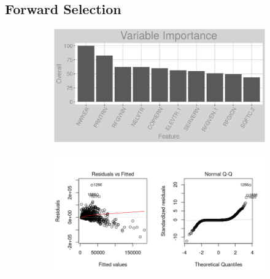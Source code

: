 \subsection{Forward Selection}
\label{appendix:electricity:lp}
\begin{figure}[h]
\centering
\begin{subfigure}{1\textwidth}
\centering
\includegraphics[width=.99\textwidth, height=0.3\textheight]{Images/electricity_lp_vars.png}
\end{subfigure}
\begin{subfigure}{1\textwidth}
\centering
\includegraphics[width=.99\textwidth, height=0.475\textheight]{Images/electricity_lp_res_1.png}
\end{subfigure}
\end{figure}
\FloatBarrier
\newpage
